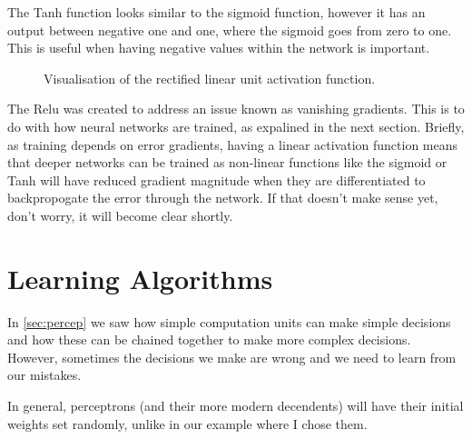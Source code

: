 The Tanh function looks similar to the sigmoid function, however it has an output between negative one and one, where the sigmoid goes from zero to one. This is useful when having negative values within the network is important.

\begin{figure}
\begin{center}
\caption{Visualisation of the rectified linear unit activation function.}
\label{fig:activation_relu}
\end{center}
\end{figure}

The Relu was created to address an issue known as vanishing gradients. This is to do with how neural networks are trained, as expalined in the next section. Briefly, as training depends on error gradients, having a linear activation function means that deeper networks  can be trained as non-linear functions like the sigmoid or Tanh will have reduced gradient magnitude when they are differentiated to backpropogate the error through the network. If that doesn't make sense yet, don't worry, it will become clear shortly.

\section{Learning Algorithms}
In \autoref{sec:percep} we saw how simple computation units can make simple decisions and how these can be chained together to make more complex decisions. However, sometimes the decisions we make are wrong and we need to learn from our mistakes.

In general, perceptrons (and their more modern decendents) will have their initial weights set randomly, unlike in our example where I chose them. 

